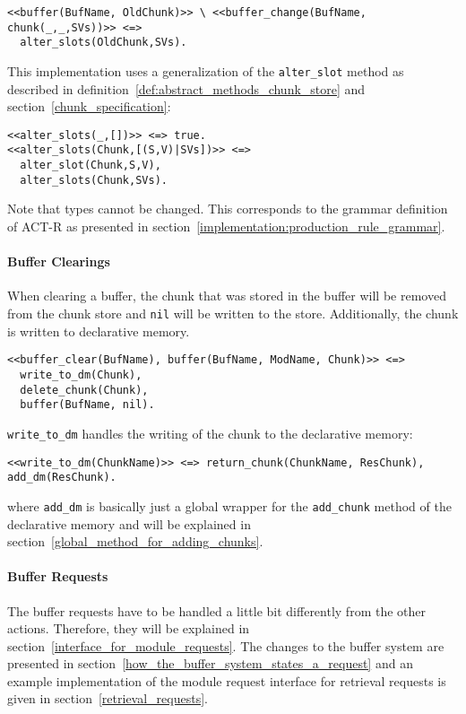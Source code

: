 \begin{lstlisting}
<<buffer(BufName, OldChunk)>> \ <<buffer_change(BufName, chunk(_,_,SVs))>> <=>
  alter_slots(OldChunk,SVs).
\end{lstlisting}

This implementation uses a generalization of the \lstinline|alter_slot| method as described in definition~\ref{def:abstract_methods_chunk_store} and section~\ref{chunk_specification}:

\begin{lstlisting}  
<<alter_slots(_,[])>> <=> true.
<<alter_slots(Chunk,[(S,V)|SVs])>> <=> 
  alter_slot(Chunk,S,V),
  alter_slots(Chunk,SVs). 
\end{lstlisting}

Note that types cannot be changed. This corresponds to the grammar definition of ACT-R as presented in section~\ref{implementation:production_rule_grammar}.

\paragraph{Buffer Clearings}

When clearing a buffer, the chunk that was stored in the buffer will be removed from the chunk store and \lstinline|nil| will be written to the store. Additionally, the chunk is written to declarative memory.

\begin{lstlisting}
<<buffer_clear(BufName), buffer(BufName, ModName, Chunk)>> <=> 
  write_to_dm(Chunk), 
  delete_chunk(Chunk), 
  buffer(BufName, nil).
\end{lstlisting}

\lstinline|write_to_dm| handles the writing of the chunk to the declarative memory:

\begin{lstlisting}
<<write_to_dm(ChunkName)>> <=> return_chunk(ChunkName, ResChunk), add_dm(ResChunk).
\end{lstlisting}

where \lstinline|add_dm| is basically just a global wrapper for the \lstinline|add_chunk| method of the declarative memory and will be explained in section~\ref{global_method_for_adding_chunks}.

\paragraph{Buffer Requests} The buffer requests have to be handled a little bit differently from the other actions. Therefore, they will be explained in section~\ref{interface_for_module_requests}. The changes to the buffer system are presented in section~\ref{how_the_buffer_system_states_a_request} and an example implementation of the module request interface for retrieval requests is given in section~\ref{retrieval_requests}.


